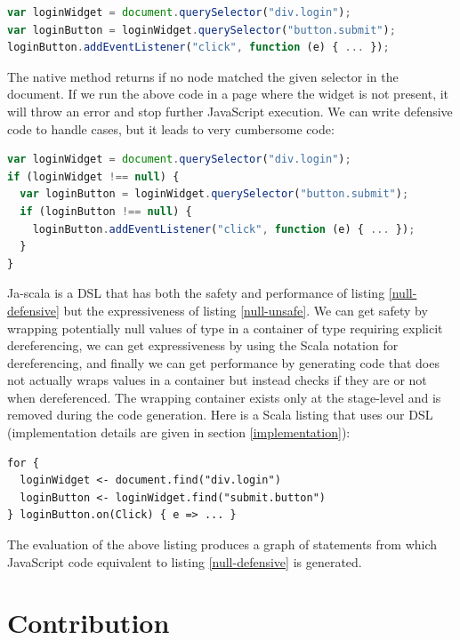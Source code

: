 \documentclass[runningheads,a4paper]{llncs}
\begin{document}
\begin{lstlisting}[language=JavaScript,label=null-unsafe,caption=Unsafe code]
var loginWidget = document.querySelector("div.login");
var loginButton = loginWidget.querySelector("button.submit");
loginButton.addEventListener("click", function (e) { ... });
\end{lstlisting}

The native  method returns  if no node matched the given selector in the document. If
we run the above code in a page where the widget is not present, it will throw an error and stop further JavaScript
execution. We can write defensive code to handle  cases, but it leads to very cumbersome code:

\begin{lstlisting}[language=JavaScript,label=null-defensive,caption=Defensive programming to handle null references]
var loginWidget = document.querySelector("div.login");
if (loginWidget !== null) {
  var loginButton = loginWidget.querySelector("button.submit");
  if (loginButton !== null) {
    loginButton.addEventListener("click", function (e) { ... });
  }
}
\end{lstlisting}

Ja-scala is a DSL that has both the safety and performance of listing \ref{null-defensive} but the
expressiveness of listing \ref{null-unsafe}. We can get safety by wrapping potentially null values of type
 in a container of type  requiring explicit dereferencing, we can get
expressiveness by using the Scala  notation for dereferencing, and finally we can get performance by
generating code that does not actually wraps values in a container but instead checks if they are  or not
when dereferenced. The wrapping container exists only at the stage-level and is removed during the code generation.
Here is a Scala listing that uses our DSL (implementation details are given in section \ref{implementation}):

\begin{lstlisting}
for {
  loginWidget <- document.find("div.login")
  loginButton <- loginWidget.find("submit.button")
} loginButton.on(Click) { e => ... }
\end{lstlisting}

The evaluation of the above listing produces a graph of statements from which JavaScript code equivalent to
listing \ref{null-defensive} is generated.

\section{Contribution}
\end{document}
